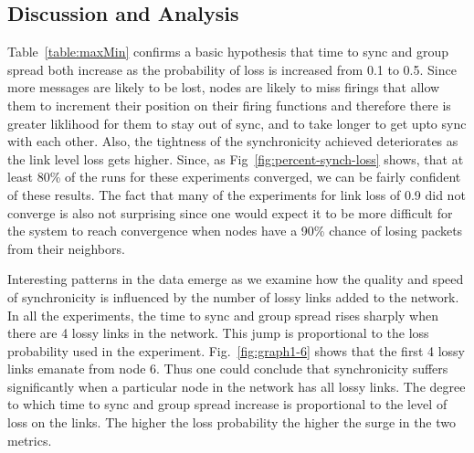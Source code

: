 \subsection{Discussion and Analysis}
Table~\ref{table:maxMin} confirms a basic hypothesis that time to sync and group spread both increase as the probability
of loss is increased from 0.1 to 0.5. Since more messages are likely to be lost, nodes are likely to miss firings
that allow them to increment their position on their firing functions and therefore there is greater liklihood for them
to stay out of sync, and to take longer to get upto sync with each other.  Also, the tightness of the synchronicity
achieved deteriorates as the link level loss gets higher.
Since, as Fig~\ref{fig:percent-synch-loss} shows, that at least 80\% of 
the runs for these experiments converged, we can be fairly confident of these results.  The fact that many of 
the experiments for link loss of 0.9 did not converge is also not surprising since one would expect it to be 
more difficult for the system to reach convergence when nodes have a 90\% chance of losing packets from their neighbors.  \newline

\noindent
Interesting patterns in the data emerge as we examine how the quality and speed of synchronicity is influenced 
by the number of lossy links added to the network. In all the experiments, the time to sync and group spread 
rises sharply when there are 4 lossy links in the network. This jump is proportional to the loss probability
used in the experiment.
Fig.~\ref{fig:graph1-6} shows that the first 4 lossy links emanate
from node 6. Thus one could conclude that synchronicity suffers significantly when a particular node in the network 
has all lossy links.
The degree to which time to sync and group spread increase is proportional to the level of loss on the links. The 
higher the loss probability the higher the surge in the two metrics. \newline

